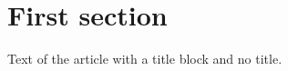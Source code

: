 \documentclass{revtex4-2}
\begin{document}
\author{Someone Nameless}
\maketitle
\section{First section}
Text of the article with a title block and no title.
\end{document}
